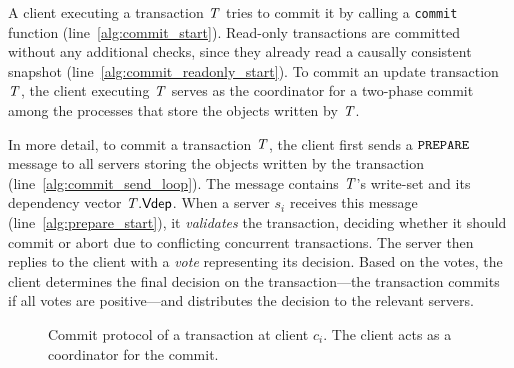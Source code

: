 A client executing a transaction $\mathit{T}$ tries to commit it by calling a {\tt commit} function (line~\ref{alg:commit_start}). Read-only transactions are committed without any additional checks, since they already read a causally consistent snapshot (line~\ref{alg:commit_readonly_start}). To commit an update transaction $\mathit{T}$, the client executing $\mathit{T}$ serves as the coordinator for a two-phase commit among the processes that store the objects written by $\mathit{T}$.

In more detail, to commit a transaction $\mathit{T}$, the client first sends a ${\tt PREPARE}$ message to all servers storing the objects written by the transaction (line~\ref{alg:commit_send_loop}). The message contains $\mathit{T}$'s write-set and its dependency vector $\mathit{T}.\mathsf{Vdep}$. When a server $s_i$ receives this message (line~\ref{alg:prepare_start}), it \emph{validates} the transaction, deciding whether it should commit or abort due to conflicting concurrent transactions. The server then replies to the client with a \emph{vote} representing its decision. Based on the votes, the client determines the final decision on the transaction---the transaction commits if all votes are positive---and distributes the decision to the relevant servers.

\begin{figure}[h]
\begin{algorithm}[H]

\end{algorithm}
\caption{Commit protocol of a transaction at client $c_i$. The client acts as a coordinator for the commit.}
\label{fig:client-commit}
\end{figure}

